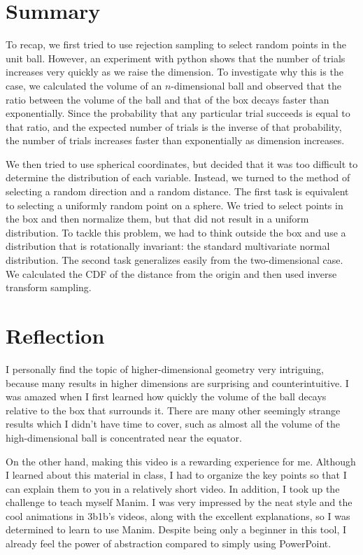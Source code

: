 \documentclass{article}
\begin{document}

\section{Summary}

To recap, we first tried to use rejection sampling to select random points in the unit ball. However, an experiment with python shows that the number of trials increases very quickly as we raise the dimension. To investigate why this is the case, we calculated the volume of an $n$-dimensional ball and observed that the ratio between the volume of the ball and that of the box decays faster than exponentially. Since the probability that any particular trial succeeds is equal to that ratio, and the expected number of trials is the inverse of that probability, the number of trials increases faster than exponentially as dimension increases.

We then tried to use spherical coordinates, but decided that it was too difficult to determine the distribution of each variable. Instead, we turned to the method of selecting a random direction and a random distance. The first task is equivalent to selecting a uniformly random point on a sphere. We tried to select points in the box and then normalize them, but that did not result in a uniform distribution. To tackle this problem, we had to think outside the box and use a distribution that is rotationally invariant: the standard multivariate normal distribution. The second task generalizes easily from the two-dimensional case. We calculated the CDF of the distance from the origin and then used inverse transform sampling.

\section{Reflection}

I personally find the topic of higher-dimensional geometry very intriguing, because many results in higher dimensions are surprising and counterintuitive. I was amazed when I first learned how quickly the volume of the ball decays relative to the box that surrounds it. There are many other seemingly strange results which I didn't have time to cover, such as almost all the volume of the high-dimensional ball is concentrated near the equator.

On the other hand, making this video is a rewarding experience for me. Although I learned about this material in class, I had to organize the key points so that I can explain them to you in a relatively short video. In addition, I took up the challenge to teach myself Manim. I was very impressed by the neat style and the cool animations in 3b1b's videos, along with the excellent explanations, so I was determined to learn to use Manim. Despite being only a beginner in this tool, I already feel the power of abstraction compared to simply using PowerPoint.
\end{document}
